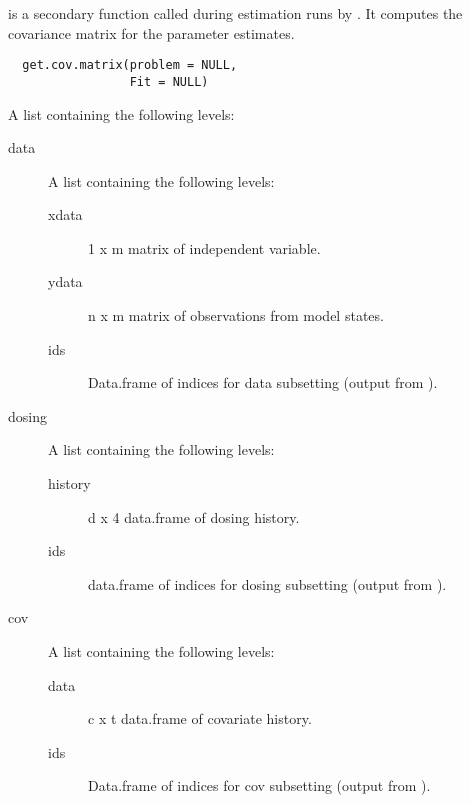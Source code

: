 %
\begin{Description}\relax
{} is a secondary function called during estimation runs by 
. It computes the covariance matrix for the parameter
estimates.
\end{Description}
%
\begin{Usage}
\begin{verbatim}
  get.cov.matrix(problem = NULL,
                 Fit = NULL)
\end{verbatim}
\end{Usage}
%
\begin{Arguments}
\begin{ldescription}
\item[\code{problem}] A list containing the following levels:\begin{description}

\item[data] A list containing the following levels:\begin{description}

\item[xdata] 1 x m matrix of independent variable.
\item[ydata] n x m matrix of observations from model states.
\item[ids] Data.frame of indices for data subsetting (output
from ).

\end{description}

\item[dosing] A list containing the following levels:\begin{description}

\item[history] d x 4 data.frame of dosing history.
\item[ids] data.frame of indices for dosing subsetting
(output from ).

\end{description}

\item[cov] A list containing the following levels:\begin{description}

\item[data] c x t data.frame of covariate history.
\item[ids] Data.frame of indices for cov subsetting (output
from ).


\end{description}
\end{description}
\end{ldescription}
\end{Arguments}
